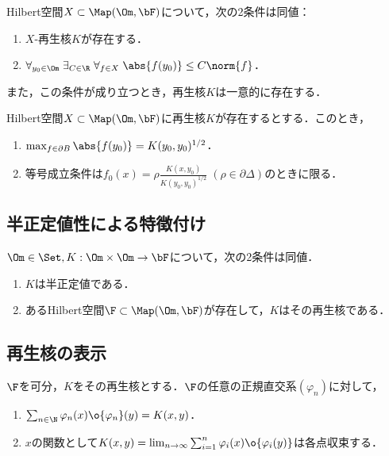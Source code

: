 \documentclass[uplatex,dvipdfmx]{jsreport}
\begin{document}
\begin{theorem}[存在と一意性]
    Hilbert空間$X\subset\Map(\Om,\bF)$について，次の2条件は同値：
    \begin{enumerate}
        \item $X$-再生核$K$が存在する．
        \item $\forall_{y_0\in\Om}\;\exists_{C\in\R}\;\forall_{f\in X}\;\abs{f(y_0)}\le C\norm{f}$．
    \end{enumerate}
    また，この条件が成り立つとき，再生核$K$は一意的に存在する．
\end{theorem}

\begin{corollary}
    Hilbert空間$X\subset\Map(\Om,\bF)$に再生核$K$が存在するとする．このとき，
    \begin{enumerate}
        \item $\max_{f\in\partial B}\abs{f(y_0)}=K(y_0,y_0)^{1/2}$．
        \item 等号成立条件は$f_0(x)=\rho\frac{K(x,y_0)}{K(y_0,y_0)^{1/2}}\;(\rho\in\partial\Delta)$のときに限る．
    \end{enumerate}
\end{corollary}

\subsection{半正定値性による特徴付け}

\begin{theorem}[半正定値性による特徴付け]
    $\Om\in\Set,K:\Om\times\Om\to\bF$について，次の2条件は同値．
    \begin{enumerate}
        \item $K$は半正定値である．
        \item あるHilbert空間$\F\subset\Map(\Om,\bF)$が存在して，$K$はその再生核である．
    \end{enumerate}
\end{theorem}

\subsection{再生核の表示}

\begin{theorem}
    $\F$を可分，$K$をその再生核とする．$\F$の任意の正規直交系$(\varphi_n)$に対して，
    \begin{enumerate}
        \item $\sum_{n\in\N}\varphi_n(x)\o{\varphi_n}(y)=K(x,y)$．
        \item $x$の関数として$K(x,y)=\lim_{n\to\infty}\sum_{i=1}^n\varphi_i(x)\o{\varphi_i(y)}$は各点収束する．
    \end{enumerate}
\end{theorem}
\end{document}
